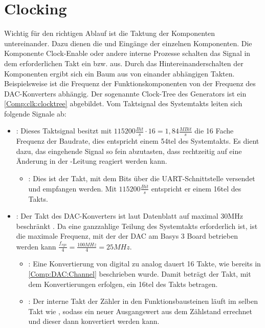 \section{Clocking}
Wichtig für den richtigen Ablauf ist die Taktung der Komponenten untereinander.
Dazu dienen die  und  Eingänge der einzelnen Komponenten.
Die Komponente Clock-Enable oder andere interne Prozesse schalten das  Signal in dem erforderlichen Takt ein bzw. aus.
Durch das Hintereinanderschalten der Komponenten ergibt sich ein Baum aus von einander abhängigen Takten.
Beispielsweise ist die Frequenz der Funktionskomponenten von der Frequenz des DAC-Konverters abhängig.
Der sogenannte Clock-Tree des Generators ist ein \cref{Comp:clk:clocktree} abgebildet.
Vom Taktsignal des Systemtakts  leiten sich folgende Signale ab:
\begin{itemize}
\item {}: Dieses Taktsignal besitzt mit $115200 \frac{Bit}{s} \cdot 16 = 1,84 \frac{MBit}{s}$ die 16 Fache Frequenz der Baudrate, dies entspricht einem 54tel des Systemtakts.
  Es dient dazu, das eingehende Signal so fein abzutasten, dass rechtzeitig auf eine Änderung in der -Leitung reagiert werden kann.
    \begin{itemize}
      \item {}: Dies ist der Takt, mit dem Bits über die UART-Schnittstelle versendet und empfangen werden.
      Mit $115200 \frac{Bit}{s}$ entspricht er einem 16tel des  Takts.
    \end{itemize}
  \item {}: Der Takt des DAC-Konverters ist laut Datenblatt auf maximal 30MHz beschränkt \cite{DAC121S101}.
    Da eine ganzzahlige Teilung des Systemtakts erforderlich ist, ist die maximale Frequenz, mit der der DAC am Basys 3 Board betrieben werden kann $\frac{f_{sys}}{4} = \frac{100MHz}{4} = 25MHz$.
    \begin{itemize}
    \item {}: Eine Konvertierung von digital zu analog dauert 16 Takte, wie bereits in \cref{Comp:DAC:Channel} beschrieben wurde.
      Damit beträgt der Takt, mit dem Konvertierungen erfolgen, ein 16tel des  Takts betragen.
    \item {}: Der interne Takt der Zähler in den Funktionsbausteinen läuft im selben Takt wie , sodass ein neuer Ausgangswert aus dem Zählstand errechnet und dieser dann konvertiert werden kann.
    \end{itemize}
\end{itemize}

